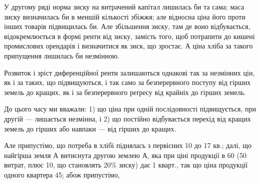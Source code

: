У другому ряді норма зиску на витрачений капітал лишилась би та
сама; маса зиску визначилась би в меншій кількості збіжжя; але відносна ціна
його проти інших товарів підвищилась би. Але збільшення зиску, там де воно
відбувається, відокремлюється в формі ренти від зиску, замість того, щоб потрапити
до кишені промислових орендарів і визначитися як зиск, що зростає.
А ціна хліба за такого припущення лишилась би незмінною.

Розвиток і зріст диференційної ренти залишаються однакові так за незмінних
цін, як і за таких, що підвищуються, і так само за безперервного поступу
від гірших земель до кращих, як і за безперервного реґресу від крайніх
до гірших земель.

До цього часу ми вважали: 1) що ціна при одній послідовності підвищується,
при другій — лишається незмінна, і 2) що постійно відбувається перехід
від кращих земель до гірших або навпаки — від гірших до кращих.

Але припустімо, що потреба в хлібі піднялась з первісних 10 до 17 кв.;
далі, що найгірша земля $А$ витиснута другою землею $А$, яка при ціні продукції
в 60 (50 витрат, плюс 10, що становлять 20\% зиску) дає
1 кварт., так що ціна продукції одного квартера \deq{} 45; абож припустімо,
\parbreak{}  %

